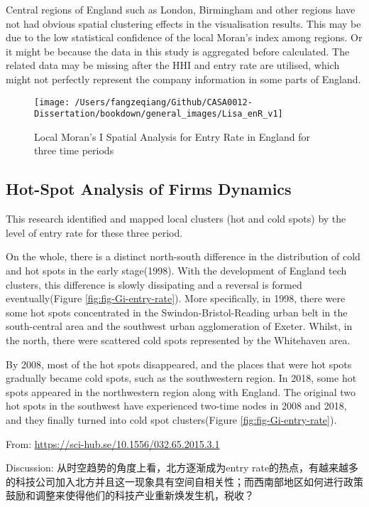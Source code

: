 \documentclass[
  12pt,
  oneside]{book}
\begin{document}
Central regions of England such as London, Birmingham and other regions have not had obvious spatial clustering effects in the visualisation results. This may be due to the low statistical confidence of the local Moran's index among regions. Or it might be because the data in this study is aggregated before calculated. The related data may be missing after the HHI and entry rate are utilised, which might not perfectly represent the company information in some parts of England.

\begin{figure}
\texttt{[image: /Users/fangzeqiang/Github/CASA0012-Dissertation/bookdown/general\_images/Lisa\_enR\_v1]} \caption{Local Moran's I Spatial Analysis for Entry Rate in England for three time periods}\label{fig:fig-lisa-entry-rate}
\end{figure}

\hypertarget{hot-spot-analysis-of-firms-dynamics}{%
\subsection{Hot-Spot Analysis of Firms Dynamics}\label{hot-spot-analysis-of-firms-dynamics}}

This research identified and mapped local clusters (hot and cold spots) by the level of entry rate for these three period.

On the whole, there is a distinct north-south difference in the distribution of cold and hot spots in the early stage(1998). With the development of England tech clusters, this difference is slowly dissipating and a reversal is formed eventually(Figure \ref{fig:fig-Gi-entry-rate}). More specifically, in 1998, there were some hot spots concentrated in the Swindon-Bristol-Reading urban belt in the south-central area and the southwest urban agglomeration of Exeter. Whilst, in the north, there were scattered cold spots represented by the Whitehaven area.

By 2008, most of the hot spots disappeared, and the places that were hot spots gradually became cold spots, such as the southwestern region. In 2018, some hot spots appeared in the northwestern region along with England. The original two hot spots in the southwest have experienced two-time nodes in 2008 and 2018, and they finally turned into cold spot clusters(Figure \ref{fig:fig-Gi-entry-rate}).

From: \url{https://sci-hub.se/10.1556/032.65.2015.3.1}

Discussion: 从时空趋势的角度上看，北方逐渐成为entry rate的热点，有越来越多的科技公司加入北方并且这一现象具有空间自相关性；而西南部地区如何进行政策鼓励和调整来使得他们的科技产业重新焕发生机，税收？
\end{document}
